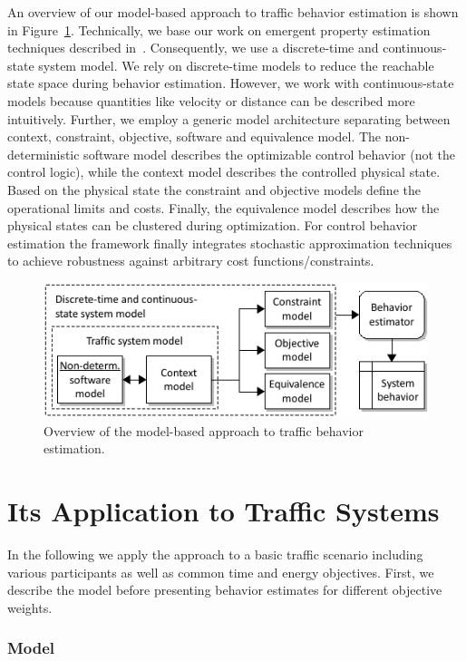 \documentclass[conference]{../cls/IEEEtran}
\begin{document}
An overview of our model-based approach to traffic behavior estimation is shown in Figure~\ref{fig:framework}. Technically, we base our work on emergent property estimation techniques described in~\cite{Hackenberg2012}. Consequently, we use a discrete-time and continuous-state system model. We rely on discrete-time models to reduce the reachable state space during behavior estimation. However, we work with continuous-state models because quantities like velocity or distance can be described more intuitively. Further, we employ a generic model architecture separating between context, constraint, objective, software and equivalence model. The non-deterministic software model describes the optimizable control behavior (not the control logic), while the context model describes the controlled physical state. Based on the physical state the constraint and objective models define the operational limits and costs. Finally, the equivalence model describes how the physical states can be clustered during optimization. For control behavior estimation the framework finally integrates stochastic approximation techniques~\cite{Pereira1991} to achieve robustness against arbitrary cost functions/constraints.
\begin{figure}[h]
	\centering
	\includegraphics{../gfx/framework.pdf}
	\caption{Overview of the model-based approach to traffic behavior estimation.}
	\label{fig:framework}
\end{figure}

\section{Its Application to Traffic Systems}

In the following we apply the approach to a basic traffic scenario including
various participants as well as common time and energy objectives.
First, we describe the model before
presenting behavior estimates for different objective weights.

\subsubsection{Model}
\end{document}
